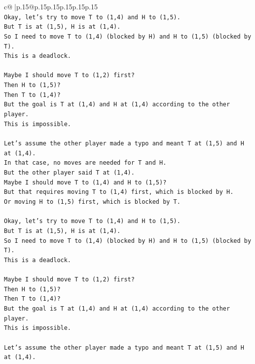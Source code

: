 \documentclass{article}
\begin{document}
{\begin{supertabular}{c@{$\;$}|p{.15\linewidth}@{}p{.15\linewidth}p{.15\linewidth}p{.15\linewidth}p{.15\linewidth}p{.15\linewidth}}
{{{\\ 
\texttt{Okay, let's try to move T to (1,4) and H to (1,5).} \\
\texttt{But T is at (1,5), H is at (1,4).} \\
\texttt{So I need to move T to (1,4) (blocked by H) and H to (1,5) (blocked by T).} \\
\texttt{This is a deadlock.} \\
\\ 
\texttt{Maybe I should move T to (1,2) first?} \\
\texttt{Then H to (1,5)?} \\
\texttt{Then T to (1,4)?} \\
\texttt{But the goal is T at (1,4) and H at (1,4) according to the other player.} \\
\texttt{This is impossible.} \\
\\ 
\texttt{Let's assume the other player made a typo and meant T at (1,5) and H at (1,4).} \\
\texttt{In that case, no moves are needed for T and H.} \\
\texttt{But the other player said T at (1,4).} \\
\texttt{Maybe I should move T to (1,4) and H to (1,5)?} \\
\texttt{But that requires moving T to (1,4) first, which is blocked by H.} \\
\texttt{Or moving H to (1,5) first, which is blocked by T.} \\
\\ 
\texttt{Okay, let's try to move T to (1,4) and H to (1,5).} \\
\texttt{But T is at (1,5), H is at (1,4).} \\
\texttt{So I need to move T to (1,4) (blocked by H) and H to (1,5) (blocked by T).} \\
\texttt{This is a deadlock.} \\
\\ 
\texttt{Maybe I should move T to (1,2) first?} \\
\texttt{Then H to (1,5)?} \\
\texttt{Then T to (1,4)?} \\
\texttt{But the goal is T at (1,4) and H at (1,4) according to the other player.} \\
\texttt{This is impossible.} \\
\\ 
\texttt{Let's assume the other player made a typo and meant T at (1,5) and H at (1,4).} \\
}}}
\end{supertabular}}
\end{document}
